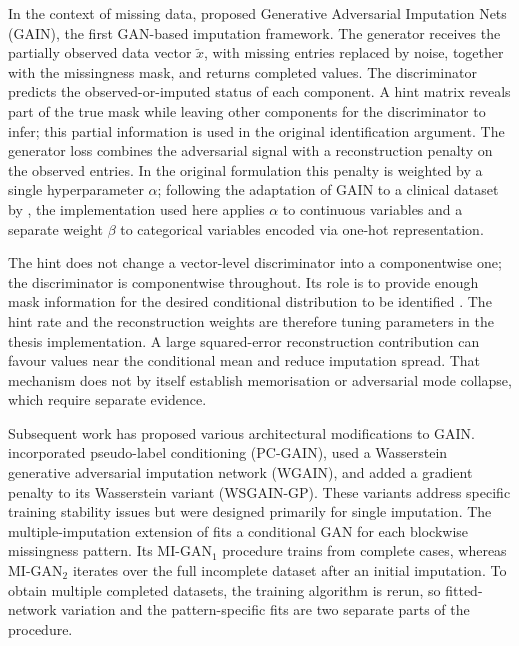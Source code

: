In the context of missing data, \citet{yoon2018gain} proposed Generative Adversarial Imputation Nets (GAIN), the first GAN-based imputation framework. The generator receives the partially observed data vector $\tilde{x}$, with missing entries replaced by noise, together with the missingness mask, and returns completed values. The discriminator predicts the observed-or-imputed status of each component. A hint matrix reveals part of the true mask while leaving other components for the discriminator to infer; this partial information is used in the original identification argument. The generator loss combines the adversarial signal with a reconstruction penalty on the observed entries. In the original formulation this penalty is weighted by a single hyperparameter $\alpha$; following the adaptation of GAIN to a clinical dataset by \citet{dong2021gain}, the implementation used here applies $\alpha$ to continuous variables and a separate weight $\beta$ to categorical variables encoded via one-hot representation.

The hint does not change a vector-level discriminator into a componentwise one; the discriminator is componentwise throughout. Its role is to provide enough mask information for the desired conditional distribution to be identified \citep{yoon2018gain}. The hint rate and the reconstruction weights are therefore tuning parameters in the thesis implementation. A large squared-error reconstruction contribution can favour values near the conditional mean and reduce imputation spread. That mechanism does not by itself establish memorisation or adversarial mode collapse, which require separate evidence.

Subsequent work has proposed various architectural modifications to GAIN. \citet{wang2021pc} incorporated pseudo-label conditioning (PC-GAIN), \citet{friedjungova2020missing} used a Wasserstein generative adversarial imputation network (WGAIN), and \citet{neves2021sgain} added a gradient penalty to its Wasserstein variant (WSGAIN-GP). These variants address specific training stability issues but were designed primarily for single imputation. The multiple-imputation extension of \citet{dai2021multiple} fits a conditional GAN for each blockwise missingness pattern. Its MI-GAN$_1$ procedure trains from complete cases, whereas MI-GAN$_2$ iterates over the full incomplete dataset after an initial imputation. To obtain multiple completed datasets, the training algorithm is rerun, so fitted-network variation and the pattern-specific fits are two separate parts of the procedure.

